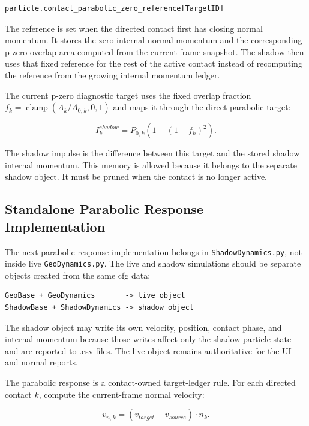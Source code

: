 \begin{verbatim}
particle.contact_parabolic_zero_reference[TargetID]
\end{verbatim}

The reference is set when the directed contact first has closing normal
momentum.  It stores the zero internal normal momentum and the corresponding
p-zero overlap area computed from the current-frame snapshot.  The shadow then
uses that fixed reference for the rest of the active contact instead of
recomputing the reference from the growing internal momentum ledger.

The current p-zero diagnostic target uses the fixed overlap fraction
\(f_k = \operatorname{clamp}(A_k/A_{0,k},0,1)\) and maps it through the direct
parabolic target:

\begin{equation}
I^{shadow}_{k} = P_{0,k}\left(1-\left(1-f_k\right)^2\right).
\end{equation}

The shadow impulse is the difference between this target and the stored shadow
internal momentum.  This memory is allowed because it belongs to the separate
shadow object.  It must be pruned when the contact is no longer active.

\subsection{Standalone Parabolic Response Implementation}

The next parabolic-response implementation belongs in
\texttt{ShadowDynamics.py}, not inside live \texttt{GeoDynamics.py}.  The live
and shadow simulations should be separate objects created from the same cfg
data:

\begin{verbatim}
GeoBase + GeoDynamics       -> live object
ShadowBase + ShadowDynamics -> shadow object
\end{verbatim}

The shadow object may write its own velocity, position, contact phase, and
internal momentum because those writes affect only the shadow particle state
and are reported to .csv files.  The live object remains
authoritative for the UI and normal reports.

The parabolic response is a contact-owned target-ledger rule.  For each
directed contact \(k\), compute the current-frame normal velocity:

\begin{equation}
v_{n,k} = (v_{target}-v_{source})\cdot n_k.
\end{equation}

